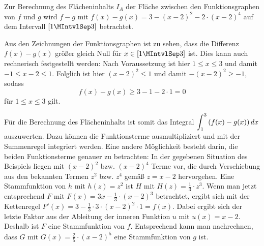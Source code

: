 \begin{MExercises}
\begin{MExercise}
\begin{MHint}{\iSolution}
Zur Berechnung des Flächeninhalts $I_A$ der Fläche zwischen den 
Funktionsgraphen von $f$ und $g$ wird $f - g$ mit 
$f(x) - g(x) = 3 - (x - 2)^2 - 2 \cdot ( x - 2)^4$ auf dem Intervall
$[1\MIntvlSep  3]$ betrachtet. 

\begin{center}
\MTikzAuto{%
\ifttm\else\begin{small}\fi
\begin{tikzpicture}[line width=1.5pt,scale=1.0,
declare function={
  u1 = 1;
  u2 = 3;
  fkt1(\x) = 3 - ((\x - 2) * (\x - 2)); %
  fkt2(\x) = 2 * pow({\x - 2}, 4); %
}
] %
\draw[->] (-0.5, 0) -- (3.5, 0) node[below left]{$x$}; %
\draw[->] (0, -0.5) -- (0, 3.5) node[below left]{$y$}; %
\foreach \x in {1, 2, 3} \draw (\x, 0) -- ++(0, -0.1) %
 node[below] {$\x$}; 
\foreach \y in {1, 2, 3} \draw (0, \y) -- ++(-0.1, 0) %
 node[left] {$\y$};
\node[below left] at (0, 0) {$0$};
\draw[domain=u1:u2,samples=120,color=\jccolorfkt, fill=\jccolorfktarea] %
 plot (\x, {fkt1(\x)});
\draw[domain=u1:u2,samples=120,color=blue, fill=\jccolorfktarea] %
 plot (\x, {fkt2(\x)+0.014});
\node[right] at (2.75, {fkt1(2.7)}) {$f(x)$};
\node[right] at (2.75, {fkt2(2.7)}) {$g(x)$};
%
\end{tikzpicture}
\ifttm\else\end{small}\fi
}
\end{center}
Aus den Zeichnungen der Funktionsgraphen ist zu sehen, dass die Differenz 
$f(x) - g(x)$ größer gleich Null für $x \in [1\MIntvlSep  3]$ ist. 
Dies kann auch rechnerisch festgestellt werden:
Nach Voraussetzung ist hier $1 \leq x \leq 3$ und damit $-1 \leq x - 2 \leq 1$. 
Folglich ist hier $(x - 2)^2 \leq 1$ und damit $-(x - 2)^2 \geq -1$, sodass
\[
f(x) - g(x) \geq 3 - 1 - 2 \cdot 1 = 0 %
\]
für $1 \leq x \leq 3$ gilt. 

Für die Berechnung des Flächeninhalts ist somit das Integral 
$\displaystyle \int_1^3 \left(f(x) - g(x)\right) d x$ auszuwerten. Dazu können 
die Funktionsterme ausmultipliziert und mit der Summenregel integriert werden.
Eine andere Möglichkeit besteht darin, die beiden Funktionsterme genauer zu
betrachten:
In der gegebenen Situation des Beispiels liegen mit $(x - 2)^2$ bzw. 
$(x - 2)^4$ Terme vor, die durch Verschiebung aus den bekannten Termen 
$z^2$ bzw. $z^4$ gemäß $z = x - 2$ hervorgehen.
Eine Stammfunktion von $h$ mit $h(z) = z^2$ ist $H$ mit 
$H(z) = \frac{1}{3} \cdot z^3$. Wenn man jetzt entsprechend $F$ mit 
$F(x) = 3 x - \frac{1}{3} \cdot (x - 2)^3$ betrachtet, ergibt sich mit der 
Kettenregel
$F'(x) = 3 - \frac{1}{3} \cdot 3 \cdot (x - 2)^2 \cdot 1 = f(x)$. 
Dabei ergibt sich der letzte Faktor aus der Ableitung der inneren Funktion 
$u$ mit $u(x) = x - 2$.  Deshalb ist $F$ eine Stammfunktion von $f$. 
Entsprechend kann man nachrechnen, dass $G$ mit 
$G(x) = \frac{2}{5} \cdot (x - 2)^5$ eine Stammfunktion von $g$ ist.


\end{MHint}
\end{MExercise}
\end{MExercises}
